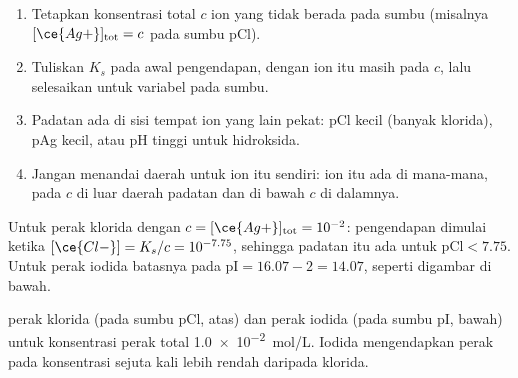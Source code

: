 \begin{method}\label{met:b1:precipitation:existence-domain}
\begin{enumerate}
  \item Tetapkan konsentrasi total $c$ ion yang tidak berada pada sumbu
        (misalnya $[\ce{Ag+}]_{\mathrm{tot}} = c$ pada sumbu pCl).
  \item Tuliskan $K_s$ pada awal pengendapan, dengan ion itu masih pada
        $c$, lalu selesaikan untuk variabel pada sumbu.
  \item Padatan ada di sisi tempat ion yang lain pekat: pCl kecil (banyak
        klorida), pAg kecil, atau pH tinggi untuk hidroksida.
  \item Jangan menandai daerah untuk ion itu sendiri: ion itu ada di
        mana-mana, pada $c$ di luar daerah padatan dan di bawah $c$ di
        dalamnya.
\end{enumerate}
\end{method}

Untuk perak klorida dengan $c = [\ce{Ag+}]_{\mathrm{tot}} = 10^{-2}$:
pengendapan dimulai ketika $[\ce{Cl-}] = K_s/c = 10^{-7.75}$, sehingga
padatan itu ada untuk $\mathrm{pCl} < 7.75$. Untuk perak iodida batasnya
pada $\mathrm{pI} = 16.07 - 2 = 14.07$, seperti digambar di bawah.

\begin{omfigure}

{\small {} perak klorida (pada sumbu pCl, atas) dan perak
iodida (pada sumbu pI, bawah) untuk konsentrasi perak total
\qty{1.0e-2}{mol/L}. Iodida mengendapkan perak pada konsentrasi sejuta
kali lebih rendah daripada klorida.}
\end{omfigure}

